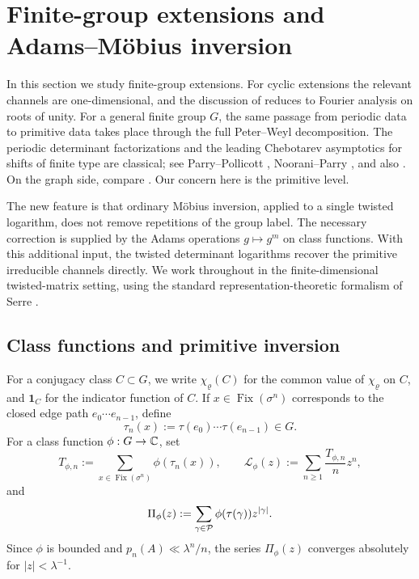 \section{Finite-group extensions and Adams--M\"obius inversion}
\label{sec:chebotarev}

In this section we study finite-group extensions. For cyclic extensions
the relevant channels are one-dimensional, and the discussion of
 reduces to Fourier analysis on roots of unity.
For a general finite group \(G\), the same passage from periodic data
to primitive data takes place through the full Peter--Weyl
decomposition. The periodic determinant factorizations and the leading
Chebotarev asymptotics for shifts of finite type are classical; see
Parry--Pollicott \cite{ParryPollicott1986Chebotarev},
Noorani--Parry \cite{NooraniParry1992ChebotarevShifts}, and also
\cite{PollicottSharp2007Chebotarev,BoyleSchmieding2017FiniteGroupExtensions,Parry1999LivsicNonAbelian}.
On the graph side, compare
\cite{KotaniSunada2000ZetaFiniteGraphs,StarkTerras1996ZetaGraphCoverings,StarkTerras2000ZetaGraphCoveringsII,TerrasStark2007ZetaGraphCoveringsIII,HasegawaSaito2016GraphMertens,HasegawaSaitoSato2015AbelianCovering,HasegawaSaitoSato2018GaloisCovering}.
Our concern here is the primitive level.

The new feature is that ordinary M\"obius inversion, applied to a single
twisted logarithm, does not remove repetitions of the group label. The
necessary correction is supplied by the Adams operations \(g\mapsto g^m\)
on class functions. With this additional input, the twisted determinant
logarithms recover the primitive irreducible channels directly. We work
throughout in the finite-dimensional twisted-matrix setting, using the
standard representation-theoretic formalism of Serre
\cite{Serre1977LinearRepresentations}.

\subsection{Class functions and primitive inversion}

For a conjugacy class \(C\subset G\), we write \(\chi_\varrho(C)\) for
the common value of \(\chi_\varrho\) on \(C\), and \(\mathbf 1_C\) for
the indicator function of \(C\). If \(x\in\operatorname{Fix}(\sigma^n)\)
corresponds to the closed edge path \(e_0\cdots e_{n-1}\), define
\[
  \tau_n(x):=\tau(e_0)\cdots\tau(e_{n-1})\in G.
\]
For a class function \(\phi:G\to\mathbb{C}\), set
\begin{equation}\label{eq:class-logarithm-def}
  T_{\phi,n}:=\sum_{x\in\operatorname{Fix}(\sigma^n)}\phi(\tau_n(x)),
  \qquad
  \mathcal L_\phi(z):=\sum_{n\ge 1}\frac{T_{\phi,n}}{n}z^n,
\end{equation}
and
\begin{equation}\label{eq:primitive-class-series-def}
  \Pi_\phi(z):=\sum_{\gamma\in\mathcal P}\phi(\tau(\gamma))z^{|\gamma|}.
\end{equation}
Since \(\phi\) is bounded and \(p_n(A)\ll \lambda^n/n\), the series
\(\Pi_\phi(z)\) converges absolutely for \(|z|<\lambda^{-1}\).

